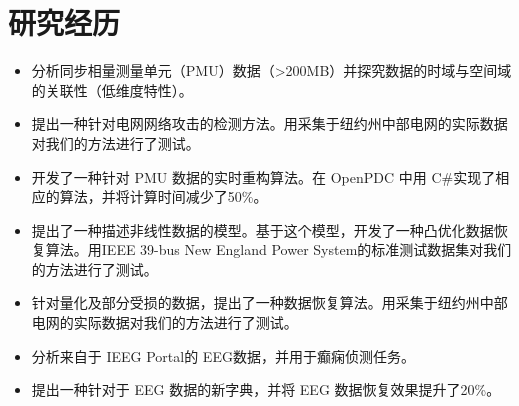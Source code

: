 \documentclass{resume}
\begin{document}
\section{研究经历}
\begin{itemize}
	\item 分析同步相量测量单元（PMU）数据（>200MB）并探究数据的时域与空间域的关联性（低维度特性）。
	\item 提出一种针对电网网络攻击的检测方法。用采集于纽约州中部电网的实际数据对我们的方法进行了测试。
	\item 开发了一种针对 PMU 数据的实时重构算法。在 OpenPDC 中用 C\#实现了相应的算法，并将计算时间减少了50\%。
	\item 提出了一种描述非线性数据的模型。基于这个模型，开发了一种凸优化数据恢复算法。用IEEE 39-bus New England Power System的标准测试数据集对我们的方法进行了测试。
	\item 针对量化及部分受损的数据，提出了一种数据恢复算法。用采集于纽约州中部电网的实际数据对我们的方法进行了测试。
\end{itemize}

\begin{itemize}
	\item 分析来自于 IEEG Portal的 EEG数据，并用于癫痫侦测任务。
	\item 提出一种针对于 EEG 数据的新字典，并将 EEG 数据恢复效果提升了20\%。
\end{itemize}
\end{document}
